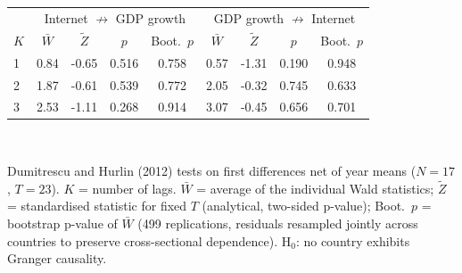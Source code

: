 \begin{tabular}{lcccccccc}\toprule
 & \multicolumn{4}{c}{Internet $\not\rightarrow$ GDP growth} & \multicolumn{4}{c}{GDP growth $\not\rightarrow$ Internet} \\
$K$ & $\bar W$ & $\tilde Z$ & $p$ & Boot.\ $p$ & $\bar W$ & $\tilde Z$ & $p$ & Boot.\ $p$ \\
\midrule
1 & 0.84 & -0.65 & 0.516 & 0.758 & 0.57 & -1.31 & 0.190 & 0.948 \\
2 & 1.87 & -0.61 & 0.539 & 0.772 & 2.05 & -0.32 & 0.745 & 0.633 \\
3 & 2.53 & -1.11 & 0.268 & 0.914 & 3.07 & -0.45 & 0.656 & 0.701 \\
\bottomrule\end{tabular}
\\[3pt]\begin{minipage}{\tablewidth}\footnotesize Dumitrescu and Hurlin (2012) tests on first differences net of year means ($N=17$, $T=23$). $K$ = number of lags. $\bar W$ = average of the individual Wald statistics; $\tilde Z$ = standardised statistic for fixed $T$ (analytical, two-sided p-value); Boot.\ $p$ = bootstrap p-value of $\bar W$ (499 replications, residuals resampled jointly across countries to preserve cross-sectional dependence). H$_0$: no country exhibits Granger causality.\end{minipage}
